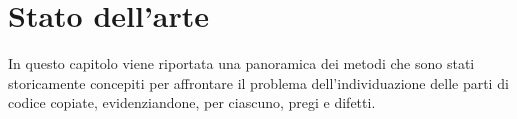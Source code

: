 \chapter{Stato dell'arte}
In questo capitolo viene riportata una panoramica dei metodi che sono stati storicamente concepiti per affrontare il problema dell'individuazione delle parti di codice copiate, evidenziandone, per ciascuno, pregi e difetti.


